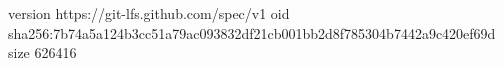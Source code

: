 version https://git-lfs.github.com/spec/v1
oid sha256:7b74a5a124b3cc51a79ac093832df21cb001bb2d8f785304b7442a9c420ef69d
size 626416

